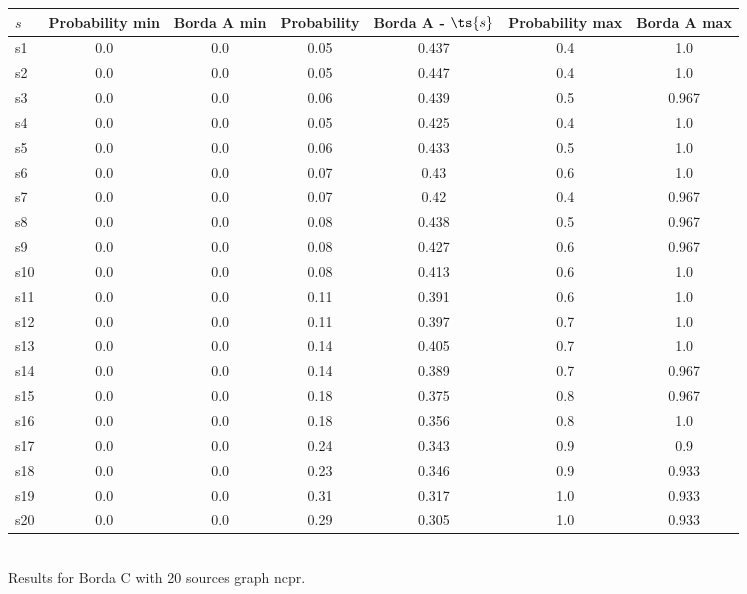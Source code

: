 \documentclass{article}
\begin{document}
\noindent\begin{tabular}{|l|c|c|c|c|c|c|}
\hline
$s$& Probability min & Borda A min & Probability & Borda A - $\ts{s}$ & Probability max & Borda A max\\
\hline
s1 &0.0 & 0.0 & 0.05 & 0.437 & 0.4 & 1.0\\
\hline
s2 &0.0 & 0.0 & 0.05 & 0.447 & 0.4 & 1.0\\
\hline
s3 &0.0 & 0.0 & 0.06 & 0.439 & 0.5 & 0.967\\
\hline
s4 &0.0 & 0.0 & 0.05 & 0.425 & 0.4 & 1.0\\
\hline
s5 &0.0 & 0.0 & 0.06 & 0.433 & 0.5 & 1.0\\
\hline
s6 &0.0 & 0.0 & 0.07 & 0.43 & 0.6 & 1.0\\
\hline
s7 &0.0 & 0.0 & 0.07 & 0.42 & 0.4 & 0.967\\
\hline
s8 &0.0 & 0.0 & 0.08 & 0.438 & 0.5 & 0.967\\
\hline
s9 &0.0 & 0.0 & 0.08 & 0.427 & 0.6 & 0.967\\
\hline
s10 &0.0 & 0.0 & 0.08 & 0.413 & 0.6 & 1.0\\
\hline
s11 &0.0 & 0.0 & 0.11 & 0.391 & 0.6 & 1.0\\
\hline
s12 &0.0 & 0.0 & 0.11 & 0.397 & 0.7 & 1.0\\
\hline
s13 &0.0 & 0.0 & 0.14 & 0.405 & 0.7 & 1.0\\
\hline
s14 &0.0 & 0.0 & 0.14 & 0.389 & 0.7 & 0.967\\
\hline
s15 &0.0 & 0.0 & 0.18 & 0.375 & 0.8 & 0.967\\
\hline
s16 &0.0 & 0.0 & 0.18 & 0.356 & 0.8 & 1.0\\
\hline
s17 &0.0 & 0.0 & 0.24 & 0.343 & 0.9 & 0.9\\
\hline
s18 &0.0 & 0.0 & 0.23 & 0.346 & 0.9 & 0.933\\
\hline
s19 &0.0 & 0.0 & 0.31 & 0.317 & 1.0 & 0.933\\
\hline
s20 &0.0 & 0.0 & 0.29 & 0.305 & 1.0 & 0.933\\
\hline
\end{tabular}\\

\noindent Results for Borda C with 20 sources graph ncpr.
\end{document}
